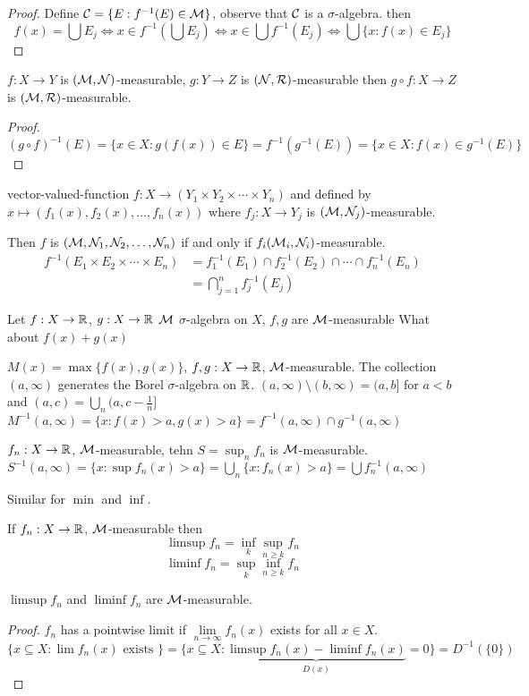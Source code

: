\begin{proof}
  Define $\mathcal C = \{E : f^{-1}(E) \in \mathcal M\}$, observe that $\mathcal C$ is a $\sigma$-algebra. then
  \[f(x) = \bigcup E_j \iff x \in f^{-1}\left(\bigcup E_j\right) \iff x \in \bigcup f^{-1}(E_j) \iff \bigcup\{x  : f(x) \in E_j\}\]
\end{proof}

\begin{claim}
$f: X \to Y$ is $(\mathcal M, \mathcal N)$-measurable, $g: Y \to Z$ is $(\mathcal N, \mathcal R)$-measurable then $g \circ f: X \to Z$ is $(\mathcal M, \mathcal R)$-measurable.
\end{claim}
\begin{proof}
  $(g \circ f)^{-1}(E) = \{x \in X : g(f(x)) \in E\} = f^{-1}(g^{-1}(E)) = \{x \in X: f(x) \in g^{-1}(E)\}$
\end{proof}

vector-valued-function
$f: X \to (Y_1 \times Y_2 \times \dotsm \times Y_n)$ and defined by 
$x \mapsto (f_1(x), f_2(x), \dotsc, f_n(x))$ where $f_j: X \to Y_j$ is $(\mathcal M, \mathcal N_j)$-measurable.

Then $f$ is $(\mathcal M, \mathcal N_1, \mathcal N_2, \dotsc,\mathcal N_n)$ if and only if $f_i(\mathcal M_i, \mathcal N_i)$-measurable.
\begin{align*}
  f^{-1}(E_1 \times E_2 \times \dotsm \times E_n) &= f_1^{-1}(E_1) \cap f_2^{-1}(E_2) \cap \dotsm \cap f_n^{-1}(E_n) \\
  &= \bigcap_{j=1}^n f_j^{-1}(E_j)
\end{align*}

Let $f: X \to \mathbb R$, $g: X \to \mathbb R$ $\mathcal M$ $\sigma$-algebra on $X$, $f, g$ are $\mathcal M$-measurable
What about $f(x) + g(x)$

$M(x) = \max\{f(x), g(x)\}$, $f,g: X \to \mathbb R$, $\mathcal M$-measurable.
The collection $(a, \infty)$ generates the Borel $\sigma$-algebra on $\mathbb R$.
$(a, \infty) \setminus (b, \infty) = (a, b]$ for $a < b$ and $(a, c) = \bigcup_n (a, c - \frac1n]$
$M^{-1}(a, \infty) = \{x : f(x) > a, g(x) > a\} = f^{-1}(a, \infty) \cap g^{-1}(a, \infty)$

$f_n: X \to \mathbb R$, $\mathcal M$-measurable, tehn $S = \sup_n f_n$ is $\mathcal M$-measurable.
$S^{-1}(a, \infty) = \{x : \sup f_n(x) > a\} = \bigcup_n \{x : f_n(x) > a\} = \bigcup f_n^{-1}(a, \infty)$

Similar for $\min$ and $\inf$.

\begin{definition}
If $f_n: X \to \mathbb R$, $\mathcal M$-measurable then \[\limsup f_n = \inf_k \sup_{n \ge k} f_n\]
\[\liminf f_n = \sup_k \inf_{n \ge k} f_n\]
\end{definition}

\begin{claim}
  $\limsup f_n$ and $\liminf f_n$ are $\mathcal M$-measurable.
\end{claim}

\begin{proof}
  $f_n$ has a pointwise limit if $\lim\limits_{n\to\infty}f_n(x)$ exists for all $x \in X$.
  $\{x \subseteq X : \lim f_n(x) \text{ exists }\} = \{x \subseteq X : \underbrace{\limsup f_n(x) - \liminf f_n(x)}_{D(x)} = 0\} = D^{-1}(\{0\})$
\end{proof}
